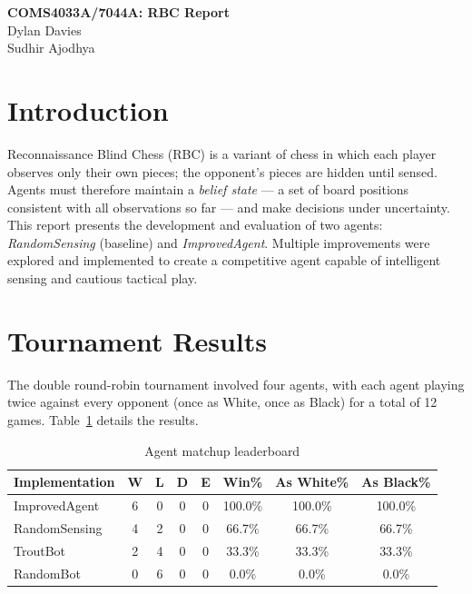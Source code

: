 \documentclass{article}
\begin{document}
\begin{center}
  {\large\bfseries COMS4033A/7044A: RBC Report}\\[4pt]
  Dylan Davies  \\[2pt]
  Sudhir Ajodhya  
\end{center}

\section{Introduction}

Reconnaissance Blind Chess (RBC) is a variant of chess in which each player observes only
their own pieces; the opponent's pieces are hidden until sensed. Agents must therefore
maintain a \emph{belief state} — a set of board positions consistent with all observations
so far — and make decisions under uncertainty. This report presents the development and
evaluation of two agents: \textit{RandomSensing} (baseline) and \textit{ImprovedAgent}.
Multiple improvements were explored and implemented to create a competitive agent capable
of intelligent sensing and cautious tactical play.

\section{Tournament Results}

The double round-robin tournament involved four agents, with each agent playing twice
against every opponent (once as White, once as Black) for a total of 12 games.
Table~\ref{tab:leaderboard} details the results.

\begin{table}[h!]
\centering
\caption{Agent matchup leaderboard}
\label{tab:leaderboard}
\begin{tabular}{lccccccc}
\toprule
\textbf{Implementation} & \textbf{W} & \textbf{L} & \textbf{D} & \textbf{E} & \textbf{Win\%} & \textbf{As White\%} & \textbf{As Black\%} \\
\midrule
ImprovedAgent & 6 & 0 & 0 & 0 & 100.0\% & 100.0\% & 100.0\% \\
RandomSensing & 4 & 2 & 0 & 0 & 66.7\%  & 66.7\%  & 66.7\%  \\
TroutBot      & 2 & 4 & 0 & 0 & 33.3\%  & 33.3\%  & 33.3\%  \\
RandomBot     & 0 & 6 & 0 & 0 & 0.0\%   & 0.0\%   & 0.0\%   \\
\bottomrule
\end{tabular}
\end{table}
\end{document}

